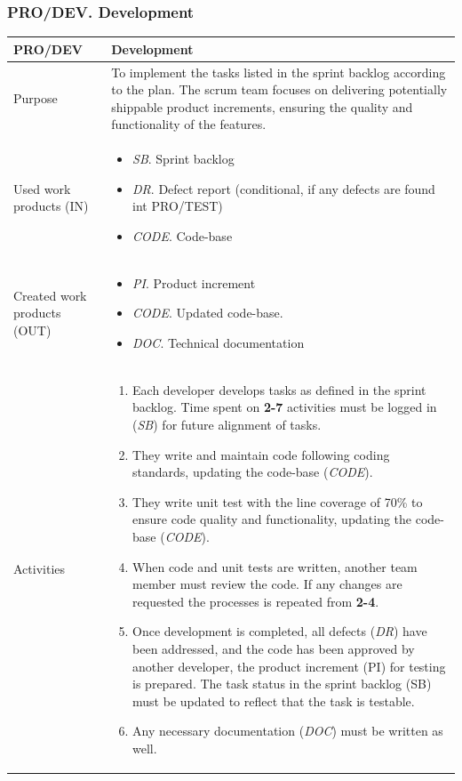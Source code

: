 \newpage
\subsubsection{PRO/DEV. Development}

\begin{table}[h!]
\begin{tabular}{l|p{}}
\hline
\textbf{PRO/DEV}        & \textbf{Development} \\ \hline
Purpose & To implement the tasks listed in the sprint backlog according to the plan. The scrum team focuses on delivering potentially shippable product increments, ensuring the quality and functionality of the features. \\ \hline
Used work products (IN)    &      
\begin{itemize}
    \item \textit{SB}. Sprint backlog
    \item \textit{DR}. Defect report (conditional, if any defects are found int PRO/TEST)
    \item \textit{CODE}. Code-base
\end{itemize}
\\ \hline
Created work products (OUT) &     
\begin{itemize}
    \item \textit{PI}. Product increment 
    \item \textit{CODE}. Updated code-base.
    \item \textit{DOC}. Technical documentation 
\end{itemize}
\\ \hline
Activities            &   
\begin{enumerate}
    \item Each developer develops tasks as defined in the sprint backlog. Time spent on \textbf{2-7} activities must be logged in (\textit{SB}) for future alignment of tasks. 
    \item They write and maintain code following coding standards, updating the code-base (\textit{CODE}). 
    \item They write unit test with the line coverage of 70\% to ensure code quality and functionality, updating the code-base (\textit{CODE}).
    \item When code and unit tests are written, another team member must review the code. If any  changes are requested the processes is repeated from \textbf{2-4}.
    \item Once development is completed, all defects (\textit{DR}) have been addressed, and the code has been approved by another developer, the product increment (PI) for testing is prepared. The task status in the sprint backlog (SB) must be updated to reflect that the task is testable.
    \item Any necessary documentation (\textit{DOC}) must be written as well.
\end{enumerate}
\end{tabular}
\label{PRO/DEV}
\end{table}

